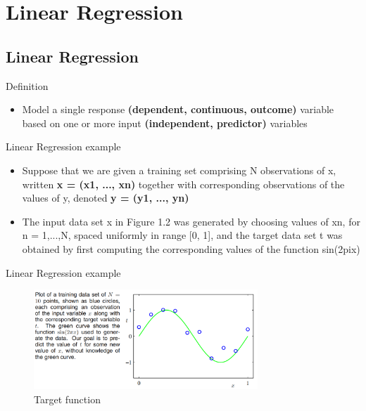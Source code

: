 \documentclass{beamer}
\begin{document}
\section{Linear Regression}
\subsection{Linear Regression}
\begin{frame}{Definition}
\begin{itemize}
\item Model a single response \textbf{(dependent, continuous, outcome)} variable based on one or more input \textbf{(independent, predictor)} variables
\end{itemize}
\end{frame}

\begin{frame}{Linear Regression example}
\justify
\begin{itemize}
\item Suppose that we are given a training set comprising N observations of x,
written \textbf{x = (x1, ..., xn)} together with corresponding observations of the values
of y, denoted \textbf{y = (y1, ..., yn)}
\item The input data set x in Figure 1.2 was generated by choosing
values of xn, for n = 1,...,N, spaced uniformly in range [0, 1], and the target
data set t was obtained by first computing the corresponding values of the function sin(2pix)
\end{itemize}
\end{frame}

\begin{frame}{Linear Regression example}
\begin{figure}
  \centering
    \includegraphics[width=0.75\textwidth]{sin2pix}
  		\caption{ Target function }
    \label{sinpix}
 \end{figure}
\end{frame}
\end{document}
